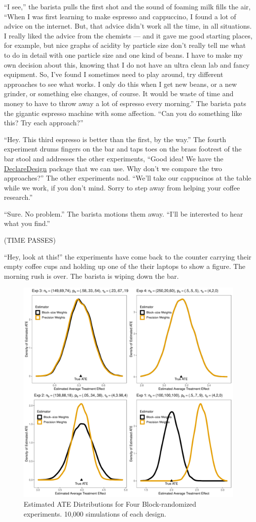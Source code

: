 \documentclass[
]{article}
\begin{document}
``I see,'' the barista pulls the first shot and the sound of foaming milk fills
the air, ``When I was first learning to make espresso and cappuccino, I found a
lot of advice on the internet. But, that advice didn't work all the time, in
all situations. I really liked the advice from the chemists --- and it gave me
good starting places, for example, but nice graphs of acidity by particle size
don't really tell me what to do in detail with one particle size and one kind
of beans. I have to make my own decision about this, knowing that I do not have
an ultra clean lab and fancy equipment. So, I've found I sometimes need to play
around, try different approaches to see what works. I only do this when I get
new beans, or a new grinder, or something else changes, of course. It would be
waste of time and money to have to throw away a lot of espresso every morning.''
The barista pats the gigantic espresso machine with some affection. ``Can you do
something like this? Try each approach?''

``Hey. This third espresso is better than the first, by the way.'' The fourth experiment drums fingers on the bar and taps toes on the brass footrest of the bar stool and addresses the other experiments, ``Good idea! We have the \href{https://declaredesign.org/}{DeclareDesign} package that we can use. Why don't we compare the two approaches?'' The other experiments nod. ``We'll take our cappucinos at the table while we work, if you don't mind. Sorry to step away from helping your coffee research.''

``Sure. No problem.'' The barista motions them away. ``I'll be interested to hear what you find.''

(TIME PASSES)

``Hey, look at this!'' the experiments have come back to the counter carrying their empty coffee cups and holding up one of the their laptops to show a figure. The morning rush is over. The barista is wiping down the bar.

\begin{figure}
\includegraphics[width=0.8\linewidth]{g_all} \caption{Estimated ATE Distributions for Four Block-randomized experiments. 10,000 simulations of each design.}\label{fig:results}
\end{figure}
\end{document}
